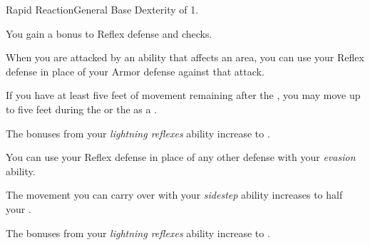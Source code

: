     \begin{feat}{Rapid Reaction}{General}
        \featpre Base Dexterity of 1.

         You gain a  bonus to Reflex defense and  checks.

         When you are attacked by an ability that affects an area, you can use your Reflex defense in place of your Armor defense against that attack.

         If you have at least five feet of movement remaining after the , you may move up to five feet during the  or the  as a .

         The bonuses from your \textit{lightning reflexes} ability increase to .

         You can use your Reflex defense in place of any other defense with your \textit{evasion} ability.

         The movement you can carry over with your \textit{sidestep} ability increases to half your .

         The bonuses from your \textit{lightning reflexes} ability increase to .
    \end{feat}

